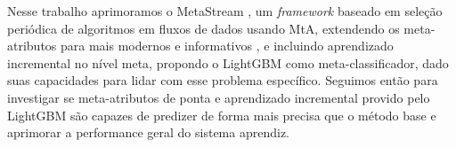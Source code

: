 Nesse trabalho aprimoramos o MetaStream \cite{rossi2012, rossi2014metastream}, um \textit{framework} baseado em seleção periódica de algoritmos em fluxos de dados usando MtA, extendendo os meta-atributos para mais modernos e informativos \cite{Rivolli2018},
e incluindo aprendizado incremental no nível meta, propondo o  LightGBM \cite{ke2017lightgbm} como meta-classificador,
dado suas capacidades para lidar com esse problema específico.
Seguimos então para investigar se meta-atributos de ponta e aprendizado incremental provido pelo LightGBM são capazes de predizer de forma mais precisa que o método base e aprimorar a performance geral do sistema aprendiz.